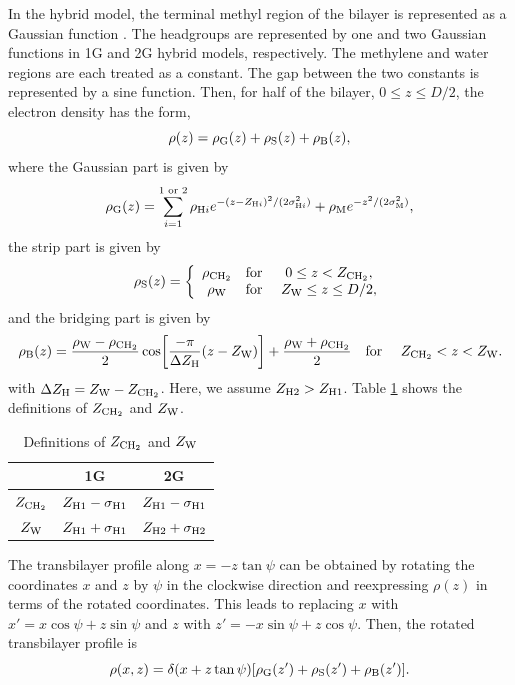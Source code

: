 In the hybrid model, the terminal methyl region of the bilayer is represented
as a Gaussian function \cite{ref:Wiener89}. The headgroups are represented by one 
and two Gaussian
functions in 1G and 2G hybrid models, respectively. The methylene and water 
regions are each treated as a constant. The gap between the two constants is 
represented by a sine function. Then, for half of the bilayer, 
$0 \leq z \leq D/2$, the electron density has the form, 
\begin{equation}
  \rho(z) = \rho_\mathrm{G}(z) + \rho_\mathrm{S}(z) + \rho_\mathrm{B}(z),
\end{equation}
where the Gaussian part is given by 
\begin{equation}
  \rho_\mathrm{G}(z) = \sum_{i=1}^{1\text{ or }2} \rho_{\mathrm{H}i}
             e^{-(z-Z_{\mathrm{H}i})^2/(2\sigma_{\mathrm{H}i}^2)} + \rho_\mathrm{M} e^{-z^2/(2\sigma_\mathrm{M}^2)},
\end{equation}
the strip part is given by
\begin{equation}
  \rho_\mathrm{S}(z) = \left\{
    \begin{array}{ccc}
      \rho_\mathrm{CH_2} & \text{for } & 0 \leq z < Z_\mathrm{CH_2}, \\
      \rho_\mathrm{W}   & \text{for } & Z_\mathrm{W} \leq z \leq D/2,
    \end{array}
  \right.
\end{equation}
and the bridging part is given by
\begin{equation}
  \rho_\mathrm{B}(z) = \frac{\rho_\mathrm{W}-\rho_\mathrm{CH_2}}{2} \cos \mathopen{}\left[ 
    \frac{-\pi}{\Delta Z_\mathrm{H}}(z-Z_\mathrm{W}) \right]\mathclose{} + \frac{\rho_\mathrm{W}+\rho_\mathrm{CH_2}}{2} \\
  \text{\quad for \quad} Z_\mathrm{CH_2} < z < Z_\mathrm{W}.
\end{equation}
with $\Delta Z_\mathrm{H}=Z_\mathrm{W}-Z_\mathrm{CH_2}$. Here, we assume $Z_{\mathrm{H}2}>Z_{\mathrm{H}1}$. 
Table \ref{tab:zchtwozw} shows the definitions of $Z_\mathrm{CH_2}$ and $Z_\mathrm{W}$.

\begin{table}[htbp]
  \centering
  \begin{tabular}{c c c}
    \hline
     & 1G & 2G \\
    \hline
    $Z_\mathrm{CH_2}$ & $Z_{\mathrm{H}1}-\sigma_{\mathrm{H}1}$ & $Z_{\mathrm{H}1}-\sigma_{\mathrm{H}1}$ \\
    $Z_\mathrm{W}$ & $Z_{\mathrm{H}1}+\sigma_{\mathrm{H}1}$ & $Z_{\mathrm{H}2}+\sigma_{\mathrm{H}2}$ \\
    \hline  
  \end{tabular}
  \caption{Definitions of $Z_\mathrm{CH_2}$ and $Z_\mathrm{W}$}
  \label{tab:zchtwozw}
\end{table}

The transbilayer profile along $x=-z\tan\psi$ can be obtained by rotating
the coordinates $x$ and $z$ by $\psi$ in the clockwise direction and
reexpressing $\rho(z)$ in terms of the rotated coordinates. This leads
to replacing $x$ with $x'=x\cos\psi+z\sin\psi$ and
$z$ with $z'=-x\sin\psi+z\cos\psi$. Then, the rotated transbilayer profile is
\begin{equation}
  \rho(x,z) = \delta(x+z\tan\psi)\mathopen{}\left[ \rho_\mathrm{G}(z') + \rho_\mathrm{S}(z') + \rho_\mathrm{B}(z') \right]\mathclose{}.
  \label{eq:rotated_profile}
\end{equation}

